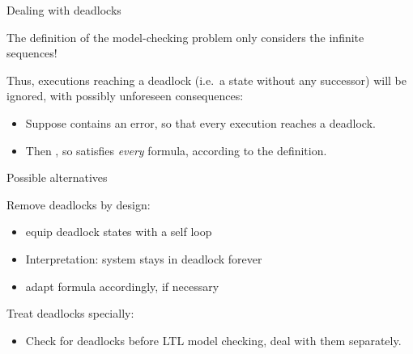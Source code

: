 
\begin{frame}{Dealing with deadlocks}

The definition of the model-checking problem only considers the
infinite sequences!

\bigskip
Thus, executions reaching a deadlock (i.e.\ a state without any
successor) will be ignored, with possibly unforeseen consequences:
\begin{itemize}
\item Suppose  contains an error, so that every execution reaches
    a deadlock.
\item Then , so  satisfies
   \emph{every} formula, according to the definition.
\end{itemize}

\end{frame}


\begin{frame}{Possible alternatives}

Remove deadlocks by design:
\begin{itemize}
\item equip deadlock states with a self loop
\item Interpretation: system stays in deadlock forever
\item adapt formula accordingly, if necessary
\end{itemize}

\bigskip
Treat deadlocks specially:
\begin{itemize}
\item Check for deadlocks before LTL model checking, deal with them separately.
\end{itemize}

\end{frame}

